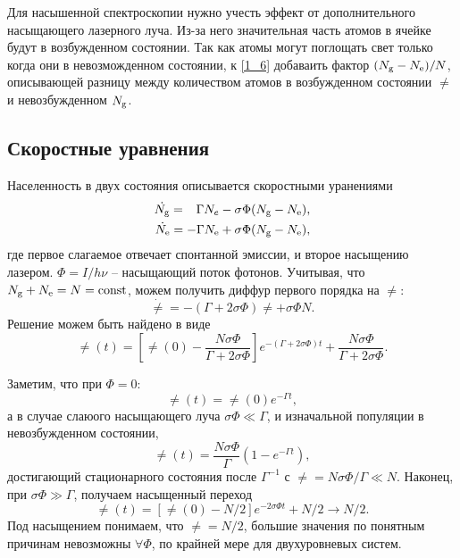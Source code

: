 Для насышенной спектроскопии нужно учесть эффект от дополнительного насыщающего лазерного луча. Из-за него значительная часть атомов в ячейке будут в возбужденном состоянии. Так как атомы могут поглощать свет только когда они в невозможденном состоянии, к \eqref{1_6} добаваить фактор $(N_{\textnormal{g}}-N_{\textnormal{e}})/N$, описывающей разницу 
между количеством атомов в возбужденном состоянии $\ne$ и невозбужденном $N_{\textnormal{g}}$. 



\subsection*{Скоростные уравнения}


 Населенность в двух состояния описывается скоростными уранениями
\begin{align*}
    \dot{N_{\textnormal{g}}} = \phantom{-}\Gamma N_e - \sigma \Phi (N_{\textnormal{g}} - N_{\textnormal{e}}), \\
    \dot{N_{\textnormal{e}}} = - \Gamma N_{\textnormal{e}} + \sigma \Phi (N_{\textnormal{g}} - N_{\textnormal{e}}),
\end{align*}
где первое слагаемое отвечает спонтанной эмиссии, и второе насыщению лазером. $\Phi = I / h \nu$ -- насыщающий поток фотонов. Учитывая, что $N_{\textnormal{g}} + N_{\textnormal{e}} = N = \textnormal{const} $, можем получить диффур первого порядка на $\ne$:
\begin{equation*}
    \dot{\ne} = - (\Gamma + 2 \sigma \Phi) \ne + \sigma \Phi N.
\end{equation*}
Решение можем быть найдено в виде
\begin{equation*}
    \ne (t) = \left[
         \ne(0) - \frac{N \sigma \Phi}{\Gamma + 2 \sigma \Phi} 
    \right] e^{-(\Gamma + 2 \sigma \Phi) t} + \frac{N \sigma \Phi}{\Gamma + 2 \sigma \Phi}.
\end{equation*}

Заметим, что при $\Phi = 0$:
\begin{equation*}
    \ne (t) = \ne (0) e^{- \Gamma t},
\end{equation*}
а в случае слаюого насыщающего луча $\sigma \Phi \ll \Gamma$, и изначальной популяции в невозбужденном состоянии,
\begin{equation*}
    \ne (t) = \frac{N \sigma \Phi}{\Gamma} \left(1 - e^{- \Gamma t}\right),
\end{equation*}
достигающий стационарного состояния после $\Gamma^{-1}$ с $\ne = N \sigma \Phi / \Gamma \ll N$.   Наконец, при $\sigma \Phi \gg \Gamma$, получаем насыщенный переход
\begin{equation*}
    \ne (t) = \left[\ne(0) - N/2\right]e^{-2 \sigma \Phi t} + N / 2 \to N/2.
\end{equation*}
Под насыщением понимаем, что $\ne = N/2$, большие значения по понятным причинам невозможны $\forall  \Phi$, по крайней мере для двухуровневых систем. 

